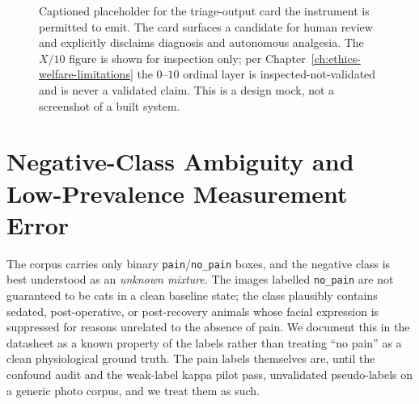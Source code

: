 \begin{figure}[t]
  \centering
  \caption[Triage-output card mock]{Captioned placeholder for the triage-output
  card the instrument is permitted to emit. The card surfaces a candidate for
  human review and explicitly disclaims diagnosis and autonomous analgesia. The
  $X/10$ figure is shown for inspection only; per Chapter~\ref{ch:ethics-welfare-limitations}
  the $0$--$10$ ordinal layer is inspected-not-validated and is never a validated
  claim. This is a design mock, not a screenshot of a built system.}
  \label{fig:triage-card}
\end{figure}

\section{Negative-Class Ambiguity and Low-Prevalence Measurement Error}
\label{sec:negative-class}

The corpus carries only binary \texttt{pain}/\texttt{no\_pain} boxes, and the
negative class is best understood as an \emph{unknown mixture}. The images
labelled \texttt{no\_pain} are not guaranteed to be cats in a clean baseline
state; the class plausibly contains sedated, post-operative, or
post-recovery animals whose facial expression is suppressed for reasons
unrelated to the absence of pain. We document this in the datasheet as a known
property of the labels rather than treating ``no pain'' as a clean physiological
ground truth. The pain labels themselves are, until the confound audit and the
weak-label kappa pilot pass, unvalidated pseudo-labels on a generic photo
corpus, and we treat them as such.

